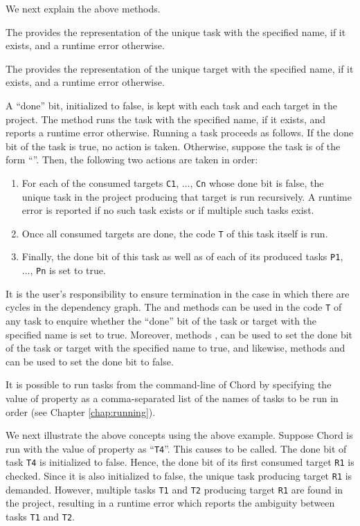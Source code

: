 We next explain the above methods.

The  provides the representation
of the unique task with the specified name, if it exists,
and a runtime error otherwise.

The  provides the representation
of the unique target with the specified name, if it exists,
and a runtime error otherwise.

A ``done'' bit, initialized to false, is kept with each task and each target in the project. 
The  method runs the task with the specified name, if it exists,
and reports a runtime error otherwise.  Running a task proceeds as follows.
If the done bit of the task is true, no action is taken.  Otherwise, 
suppose the task is of the form ``''.  Then,
the following two actions are taken in order:

\begin{enumerate}
\item
For each of the consumed targets {\tt C1}, ..., {\tt Cn} 
whose done bit is false, the unique task in the project producing that target 
is run recursively.
A runtime error is reported if no such task exists or if multiple such tasks exist.
\item
Once all consumed targets are done, the code {\tt T} of this task itself
is run.
\item
Finally, the done bit of this task as well as of each of its produced tasks
{\tt P1}, ..., {\tt Pn} is set to true.
\end{enumerate}

It is the user's responsibility to ensure termination in the case in which there are
cycles in the dependency graph.  The  and 
methods can be used in the code {\tt T} of any task to enquire
whether the ``done'' bit of the task or target with the specified name is set to true.
Moreover, methods ,  can be used to set
the done bit of the task or target with the specified name to true, and likewise,
methods  and  can be used
to set the done bit to false.

It is possible to run tasks from the command-line of Chord by specifying the value of property
 as a comma-separated list of the names of tasks to be run in order
(see Chapter \ref{chap:running}).

We next illustrate the above concepts using the above example.
Suppose Chord is run with the value of property  as ``{\tt T4}''.
This causes  to be called.  The done bit of task {\tt T4} is initialized to false.
Hence, the done bit of its first consumed target {\tt R1} is checked.
Since it is also initialized to false, the unique task producing
target {\tt R1} is demanded.  However, multiple tasks {\tt T1} and {\tt T2} 
producing target {\tt R1} are found in the project, resulting in a runtime error which
reports the ambiguity between tasks {\tt T1} and {\tt T2}.

